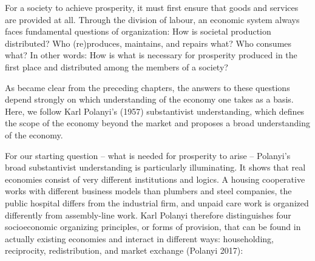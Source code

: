 \documentclass[
  british,
  a4paper,
  DIV=11,
  numbers=noendperiod,
  oneside,
  openany]{scrreprt}
\begin{document}
For a society to achieve prosperity, it must first ensure that goods and
services are provided at all. Through the division of labour, an
economic system always faces fundamental questions of organization: How
is societal production distributed? Who (re)produces, maintains, and
repairs what? Who consumes what? In other words: How is what is
necessary for prosperity produced in the first place and distributed
among the members of a society?

As became clear from the preceding chapters, the answers to these
questions depend strongly on which understanding of the economy one
takes as a basis. Here, we follow Karl Polanyi's (1957) substantivist
understanding, which defines the scope of the economy beyond the market
and proposes a broad understanding of the economy.

For our starting question -- what is needed for prosperity to arise --
Polanyi's broad substantivist understanding is particularly
illuminating. It shows that real economies consist of very different
institutions and logics. A housing cooperative works with different
business models than plumbers and steel companies, the public hospital
differs from the industrial firm, and unpaid care work is organized
differently from assembly-line work. Karl Polanyi therefore
distinguishes four socioeconomic organizing principles, or forms of
provision, that can be found in actually existing economies and interact
in different ways: householding, reciprocity, redistribution, and market
exchange (Polanyi 2017):
\end{document}
